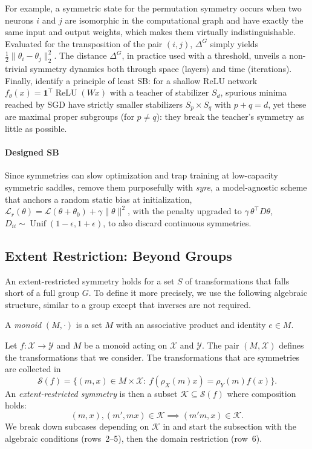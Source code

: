\documentclass[mathematics,review,submit,moreauthors]{Definitions/mdpi}
\begin{document}
For example, a symmetric state for the permutation symmetry occurs when two neurons $i$ and $j$ are isomorphic in the computational graph and have exactly the same input and output weights, which makes them virtually indistinguishable.
Evaluated for the transposition of the pair $(i,j)$, $\Delta^G$ simply yields $\frac12\| \theta_i - \theta_j \|_2^2$.
The distance $\Delta^G$, in practice used with a threshold, unveils a non-trivial symmetry dynamics both through space (layers) and time (iterations).
Finally, \citet{arjevani2023} identify a principle of least SB: for a shallow ReLU network $f_\theta(x)=\mathbf 1^\top\operatorname{ReLU}(Wx)$ with a teacher of stabilizer $S_d$, spurious minima reached by SGD have strictly smaller stabilizers $S_p\times S_q$ with $p+q=d$, yet these are maximal proper subgroups (for $p\neq q$): they break the teacher's symmetry as little as possible.

\paragraph{Designed SB}
Since symmetries can slow optimization and trap training at low-capacity symmetric saddles, \citet{ziyin2024b} remove them purposefully with \emph{syre}, a model-agnostic scheme that anchors a random static bias at initialization, $\mathcal{L}_r(\theta)=\mathcal{L}(\theta+\theta_0)+\gamma\|\theta\|^2$, with the penalty upgraded to $\gamma\,\theta^\top D\theta$, $D_{ii}\sim\operatorname{Unif}(1-\epsilon,1+\epsilon)$, to also discard continuous symmetries.


\subsection{Extent Restriction: Beyond Groups}\label{sec:extent-restriction}
An extent-restricted symmetry holds for a set $S$ of transformations that falls short of a full group $G$.
To define it more precisely, we use the following algebraic structure, similar to a group except that inverses are not required.
\begin{Definition}
    A \emph{monoid} $(M,\cdot)$ is a set $M$ with an associative product and identity $e\in M$.
\end{Definition}
Let $f:\mathcal X\to\mathcal Y$ and $M$ be a monoid acting on $\mathcal{X}$ and $\mathcal{Y}$.
The pair $(M,\mathcal{X})$ defines the transformations that we consider.
The transformations that are symmetries are collected in
$$
    \mathcal S(f)=\{(m,x)\in M\times\mathcal X:\ f(\rho_X(m)x)=\rho_Y(m)f(x)\}.
$$
An \emph{extent-restricted symmetry} is then a subset $\mathcal K\subseteq \mathcal S(f)$ where composition holds:
$$
    (m,x), (m',mx)\in \mathcal K \implies (m'm,x)\in \mathcal K.
$$
We break down subcases depending on $\mathcal K$ in  and start the subsection with the algebraic conditions (rows~2--5), then the domain restriction (row~6).
\end{document}
